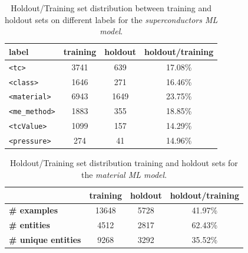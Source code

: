 \documentclass[]{interact}
\theoremstyle{plain}%
\theoremstyle{definition}
\theoremstyle{remark}
\begin{document}
\begin{table}[ht]
    \centering\small
    \begin{tabular}{lccc}
        \toprule
        label                 & \textbf{training} & \textbf{holdout} & \textbf{holdout/training } \\
        \midrule
        \texttt{<tc>}         & 3741              & 639              & 17.08\%                    \\
        \texttt{<class>}      & 1646              & 271              & 16.46\%                    \\
        \texttt{<material>}   & 6943              & 1649             & 23.75\%                    \\
        \texttt{<me\_method>} & 1883              & 355              & 18.85\%                    \\
        \texttt{<tcValue>}    & 1099              & 157              & 14.29\%                    \\
        \texttt{<pressure>}   & 274               & 41               & 14.96\%                    \\
        \bottomrule
    \end{tabular}

    \caption{Holdout/Training set distribution between training and holdout sets on different labels for the \textit{superconductors ML model}.}
    \label{tab:training-holdout-labels-distribution-annex}
\end{table}

\begin{table}[ht]
    \centering\small
    \begin{tabular}{lccc}
        \toprule
                                    & \textbf{training} & \textbf{holdout} & \textbf{holdout/training} \\
        \midrule
        \textbf{\# examples}        & 13648             & 5728             & 41.97\%                   \\
        \textbf{\# entities}        & 4512              & 2817             & 62.43\%                   \\
        \textbf{\# unique entities} & 9268              & 3292             & 35.52\%                   \\
        \bottomrule
    \end{tabular}

    \caption{Holdout/Training set distribution training and holdout sets for the \textit{material ML model}.}
    \label{tab:training-holdout-set-material-distribution-annex}
\end{table}
\end{document}
